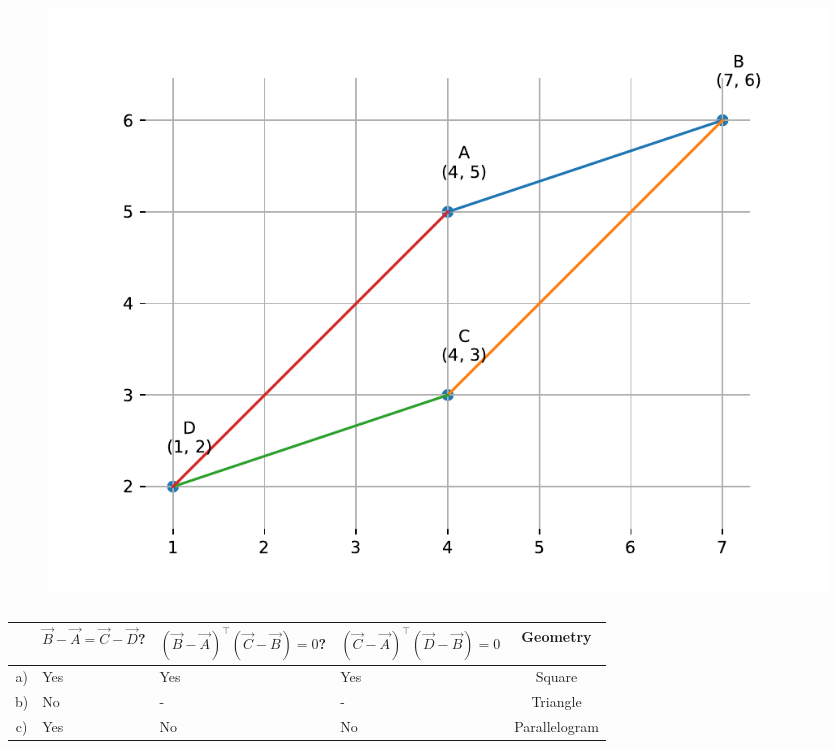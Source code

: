 %	
\begin{figure}[H]
	\begin{center} 
	    \includegraphics[width=0.75\columnwidth]{chapters/10/7/1/6/figs/fig3.pdf}
	\end{center}
\caption{}
\label{fig:10/7/1/6/Fig3}
\end{figure}
%
\begin{table}[H]
    \centering
	    \begin{tabularx}{\columnwidth}{|c|X|X|X|c|}
        \hline
		    &{\scriptsize $\vec{B}-\vec{A} = \vec{C}-\vec{D}$?} & {\tiny $(\vec{B}-\vec{A})^\top (\vec{C}-\vec{B}) =  0$?} & {\tiny $(\vec{C}-\vec{A})^\top (\vec{D}-\vec{B}) = 0$}& \textbf{Geometry}\\
        \hline
	    a)& Yes & Yes & Yes& Square \\
        \hline
	    b)& No & -&- & Triangle\\
        \hline
	    c)&Yes & No & No & Parallelogram\\
        \hline
	\end{tabularx}
	\caption{}
	\label{tab:10/7/1/6/inner}
\end{table}
